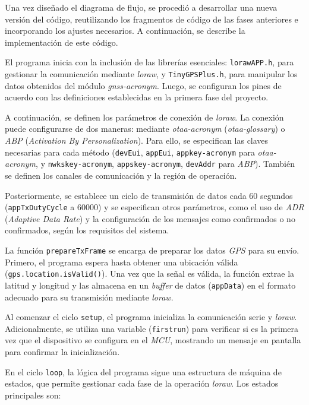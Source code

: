 Una vez diseñado el diagrama de flujo, se procedió a desarrollar una nueva versión del código, reutilizando los fragmentos de código de las fases anteriores e incorporando los ajustes necesarios. A continuación, se describe la implementación de este código.

El programa inicia con la inclusión de las librerías esenciales: \texttt{\acrshort{loraw}APP.h}, para gestionar la comunicación mediante \textit{\acrshort{loraw}}, y \texttt{TinyGPSPlus.h}, para manipular los datos obtenidos del módulo \textit{\acrshort{gnss-acronym}}. Luego, se configuran los pines de acuerdo con las definiciones establecidas en la primera fase del proyecto.

A continuación, se definen los parámetros de conexión de \textit{\acrshort{loraw}}. La conexión puede configurarse de dos maneras: mediante \textit{\acrshort{otaa-acronym}} (\textit{\gls{otaa-glossary}}) o \textit{ABP} (\textit{Activation By Personalization}). Para ello, se especifican las claves necesarias para cada método (\texttt{devEui}, \texttt{appEui}, \texttt{\acrshort{appkey-acronym}} para \textit{\acrshort{otaa-acronym}}, y \texttt{\acrshort{nwkskey-acronym}}, \texttt{\acrshort{appskey-acronym}}, \texttt{devAddr} para \textit{ABP}). También se definen los canales de comunicación y la región de operación.

Posteriormente, se establece un ciclo de transmisión de datos cada 60 segundos (\texttt{appTxDutyCycle} a 60000) y se especifican otros parámetros, como el uso de \textit{ADR} (\textit{Adaptive Data Rate}) y la configuración de los mensajes como confirmados o no confirmados, según los requisitos del sistema.

La función \texttt{prepareTxFrame} se encarga de preparar los datos \textit{GPS} para su envío. Primero, el programa espera hasta obtener una ubicación válida (\texttt{gps.location.isValid()}). Una vez que la señal es válida, la función extrae la latitud y longitud y las almacena en un \textit{buffer} de datos (\texttt{appData}) en el formato adecuado para su transmisión mediante \textit{\acrshort{loraw}}.

Al comenzar el ciclo \texttt{setup}, el programa inicializa la comunicación serie y \textit{\acrshort{loraw}}. Adicionalmente, se utiliza una variable (\texttt{firstrun}) para verificar si es la primera vez que el dispositivo se configura en el \textit{MCU}, mostrando un mensaje en pantalla para confirmar la inicialización.

En el ciclo \texttt{loop}, la lógica del programa sigue una estructura de máquina de estados, que permite gestionar cada fase de la operación \textit{\acrshort{loraw}}. Los estados principales son:

